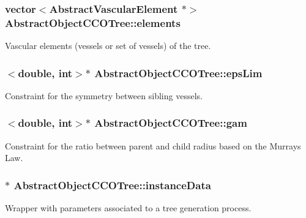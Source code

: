 \subsubsection[{\texorpdfstring{elements}{elements}}]{\setlength{\rightskip}{0pt plus 5cm}vector$<${\bf Abstract\+Vascular\+Element} $\ast$$>$ Abstract\+Object\+C\+C\+O\+Tree\+::elements\hspace{0.3cm}{\ttfamily [protected]}}\hypertarget{class_abstract_object_c_c_o_tree_a1a5790a267dd42e96d0dec9d60808be8}{}\label{class_abstract_object_c_c_o_tree_a1a5790a267dd42e96d0dec9d60808be8}
Vascular elements (vessels or set of vessels) of the tree. 
\subsubsection[{\texorpdfstring{eps\+Lim}{epsLim}}]{$<$double, int$>$$\ast$ Abstract\+Object\+C\+C\+O\+Tree\+::eps\+Lim\hspace{0.3cm}{\ttfamily [protected]}}\hypertarget{class_abstract_object_c_c_o_tree_a62d3e1ff7e74a6236422273f58fc6012}{}\label{class_abstract_object_c_c_o_tree_a62d3e1ff7e74a6236422273f58fc6012}
Constraint for the symmetry between sibling vessels. 
\subsubsection[{\texorpdfstring{gam}{gam}}]{$<$double, int$>$$\ast$ Abstract\+Object\+C\+C\+O\+Tree\+::gam\hspace{0.3cm}{\ttfamily [protected]}}\hypertarget{class_abstract_object_c_c_o_tree_aad315b93744637e18153c4434dac067d}{}\label{class_abstract_object_c_c_o_tree_aad315b93744637e18153c4434dac067d}
Constraint for the ratio between parent and child radius based on the Murray\textquotesingle{}s Law. 
\subsubsection[{\texorpdfstring{instance\+Data}{instanceData}}]{$\ast$ Abstract\+Object\+C\+C\+O\+Tree\+::instance\+Data\hspace{0.3cm}{\ttfamily [protected]}}\hypertarget{class_abstract_object_c_c_o_tree_aca7aecbd89dadc46dd9dce14cfde31e1}{}\label{class_abstract_object_c_c_o_tree_aca7aecbd89dadc46dd9dce14cfde31e1}
Wrapper with parameters associated to a tree generation process. 
